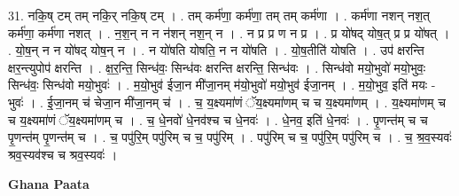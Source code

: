 \documentclass[17pt]{extarticle}
\begin{document}
31. नकि॒ष् टम् तम् नकि॒र् नकि॒ष् टम् । . तम् कर्म॑णा॒ कर्म॑णा॒ तम् तम् कर्म॑णा । . कर्म॑णा नशन् नश॒त् कर्म॑णा॒ कर्म॑णा नशत् । . न॒श॒न् न न न॑शन् नश॒न् न । . न प्र प्र ण न प्र । . प्र यो॑षद् योष॒त् प्र प्र यो॑षत् । . यो॒ष॒न् न न यो॑षद् योष॒न् न । . न यो॑षति योषति॒ न न यो॑षति । . यो॒ष॒तीति॑ योषति । . उप॑ क्षरन्ति क्षर॒न्त्युपोप॑ क्षरन्ति । . क्ष॒र॒न्ति॒ सिन्ध॑वः॒ सिन्ध॑वः क्षरन्ति क्षरन्ति॒ सिन्ध॑वः । . सिन्ध॑वो मयो॒भुवो॑ मयो॒भुवः॒ सिन्ध॑वः॒ सिन्ध॑वो मयो॒भुवः॑ । . म॒यो॒भुव॑ ईजा॒न मी॑जा॒नम् म॑यो॒भुवो॑ मयो॒भुव॑ ईजा॒नम् । . म॒यो॒भुव॒ इति॑ मयः - भुवः॑ । . ई॒जा॒नम् च॑ चेजा॒न मी॑जा॒नम् च॑ । . च॒ य॒क्ष्यमा॑णं ॅय॒क्ष्यमा॑णम् च च य॒क्ष्यमा॑णम् । . य॒क्ष्यमा॑णम् च च य॒क्ष्यमा॑णं ॅय॒क्ष्यमा॑णम् च । . च॒ धे॒नवो॑ धे॒नव॑श्च च धे॒नवः॑ । . धे॒नव॒ इति॑ धे॒नवः॑ । . पृ॒णन्त॑म् च च पृ॒णन्त॑म् पृ॒णन्त॑म् च । . च॒ पपु॑रि॒म् पपु॑रिम् च च॒ पपु॑रिम् । . पपु॑रिम् च च॒ पपु॑रि॒म् पपु॑रिम् च । . च॒ श्र॒व॒स्यवः॑ श्रव॒स्यव॑श्च च श्रव॒स्यवः॑ । \newline

\textbf{Ghana Paata } \newline
\end{document}
